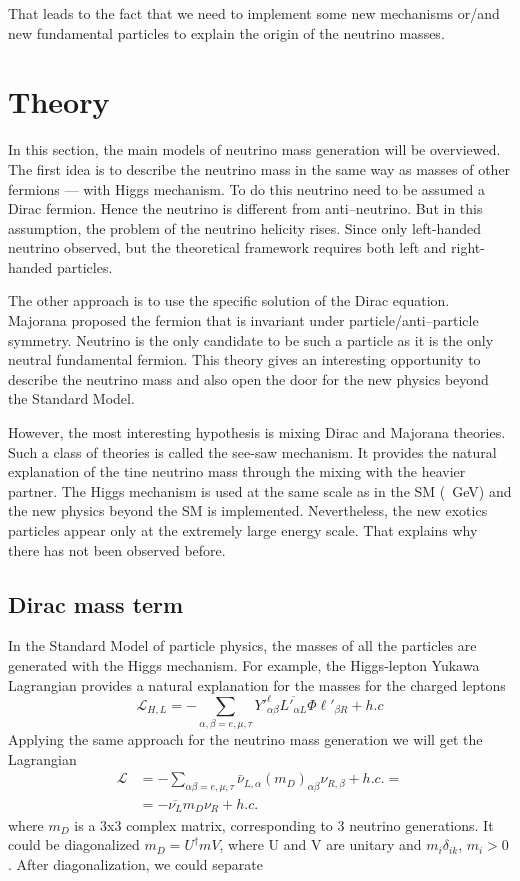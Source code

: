 \documentclass[../main.tex]{subfiles}
\begin{document}
That leads to the fact that we need to implement some new mechanisms or/and new fundamental particles to explain the origin of the neutrino masses.

\section{Theory}
In this section, the main models of neutrino mass generation will be overviewed. The first idea is to describe the neutrino mass in the same way as masses of other fermions --- with Higgs mechanism. To do this neutrino need to be assumed a Dirac fermion. Hence the neutrino is different from anti--neutrino. But in this assumption, the problem of the neutrino helicity rises. Since only left-handed neutrino observed, but the theoretical framework requires both left and right-handed particles.

The other approach is to use the specific solution of the Dirac equation. Majorana proposed the fermion that is invariant under particle/anti--particle symmetry. Neutrino is the only candidate to be such a particle as it is the only neutral fundamental fermion. This theory gives an interesting opportunity to describe the neutrino mass and also open the door for the new physics beyond the Standard Model.

However, the most interesting hypothesis is mixing Dirac and Majorana theories. Such a class of theories is called the see-saw mechanism. It provides the natural explanation of the tine neutrino mass through the mixing with the heavier partner. The Higgs mechanism is used at the same scale as in the SM (~GeV) and the new physics beyond the SM is implemented. Nevertheless, the new exotics particles appear only at the extremely large energy scale. That explains why there has not been observed before.

\subsection{Dirac mass term}
In the Standard Model of particle physics, the masses of all the particles are generated with the Higgs mechanism. For example, the Higgs-lepton Yukawa Lagrangian provides a natural explanation for the masses for the charged leptons
\begin{equation}
\mathcal{L}_{H, L}=-\sum_{\alpha, \beta=e,\mu,\tau}Y'^\ell_{\alpha\beta}\overline{L'_{\alpha L}}\Phi\ell'_{\beta R}+h.c
\end{equation}
Applying the same approach for the neutrino mass generation we will get the Lagrangian
\begin{align}
\mathcal{L}&=-\sum_{\alpha\beta=e,\mu,\tau}\bar{\nu}_{L,\alpha}(m_D)_{\alpha\beta}\nu_{R,\beta}+h.c. =\nonumber \\
&=-\overline{\nu_L}m_D\nu_R+h.c.
\end{align}
where $m_D$ is a 3x3 complex matrix, corresponding to 3 neutrino generations. It could be diagonalized $m_D=U^\dag m V$, where U and V are unitary and $m_i\delta_{ik}$, $m_i>0$. After diagonalization, we could separate
\end{document}
